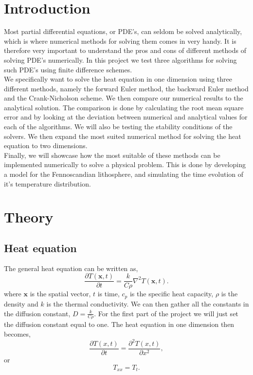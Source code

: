 \documentclass{article}
\begin{document}
\begin{multicols}{2}

\section{Introduction}


Most partial differential equations, or PDE's, can seldom be solved analytically, which is where numerical methods for solving them comes in very handy. It is therefore very important to understand the pros and cons of different methods of solving PDE's numerically. 
In this project we test three algorithms for solving such PDE's using finite difference schemes. \\ We specifically want to solve the heat equation in one dimension using three different methods, namely the forward Euler method, the backward Euler method and the Crank-Nicholson scheme. We then compare our numerical results to the analytical solution. The comparison is done by calculating the root mean square error and by looking at the deviation between numerical and analytical values for each of the algorithms. We will also be testing the stability conditions of the solvers. We then expand the most suited numerical method for solving the heat equation to two dimensions. \\ 
Finally, we will showcase how the most suitable of these methods can be implemented numerically to solve a physical problem. This is done by developing a model for the Fennoscandian lithosphere, and simulating the time evolution of it's temperature distribution. 

\section{Theory}

\subsection{Heat equation}

The general heat equation can be written as,
\begin{equation}
	\frac{\partial T(\textbf{x}, t)}{\partial t} = \frac{k}{C\rho}\nabla^2 T(\textbf{x}, t). \label{eq:gen_heat}
\end{equation}
where $\textbf{x}$ is the spatial vector, $t$ is time, $c_p$ is the specific heat capacity, $\rho$ is the density and $k$ is the thermal conductivity. We can then gather all the constants in the diffusion constant, $D=\frac{k}{C\rho}$. For the first part of the project we will just set the diffusion constant equal to one. The heat equation in one dimension then becomes, 
\begin{equation}
	\frac{\partial T(x,t)}{\partial t} = \frac{\partial^2 T(x,t)}{\partial x^2}, \label{eq:heat_one}
\end{equation}
or 
\begin{equation}
	T_{xx}=T_t.
\end{equation}

\end{multicols}
\end{document}
